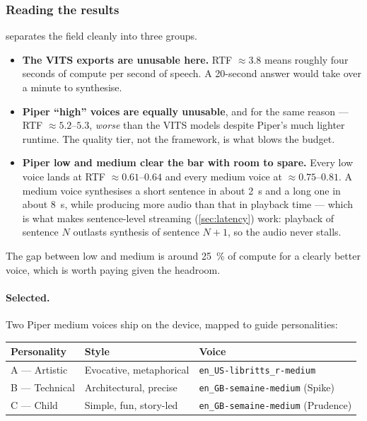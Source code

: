 \documentclass[11pt,a4paper]{article}
\begin{document}
\subsubsection{Reading the results}

 separates the field cleanly into three groups.

\begin{itemize}
  \item \textbf{The VITS exports are unusable here.} RTF $\approx 3.8$ means
        roughly four seconds of compute per second of speech. A 20-second
        answer would take over a minute to synthesise.
  \item \textbf{Piper ``high'' voices are equally unusable}, and for the same
        reason --- RTF $\approx 5.2$--$5.3$, \emph{worse} than the VITS models
        despite Piper's much lighter runtime. The quality tier, not the
        framework, is what blows the budget.
  \item \textbf{Piper low and medium clear the bar with room to spare.} Every
        low voice lands at RTF $\approx 0.61$--$0.64$ and every medium voice at
        $\approx 0.75$--$0.81$. A medium voice synthesises a short sentence in
        about \SI{2}{\second} and a long one in about \SI{8}{\second}, while
        producing more audio than that in playback time --- which is what makes
        sentence-level streaming (\cref{sec:latency}) work: playback of
        sentence $N$ outlasts synthesis of sentence $N+1$, so the audio never
        stalls.
\end{itemize}

The gap between low and medium is around \SI{25}{\percent} of compute for a
clearly better voice, which is worth paying given the headroom.

\paragraph{Selected.} Two Piper medium voices ship on the device, mapped to
guide personalities:

\begin{center}
\begin{tabular}{lll}
\toprule
\textbf{Personality} & \textbf{Style} & \textbf{Voice} \\
\midrule
A --- Artistic  & Evocative, metaphorical & \texttt{en\_US-libritts\_r-medium} \\
B --- Technical & Architectural, precise  & \texttt{en\_GB-semaine-medium} (Spike) \\
C --- Child     & Simple, fun, story-led  & \texttt{en\_GB-semaine-medium} (Prudence) \\
\bottomrule
\end{tabular}
\end{center}
\end{document}
